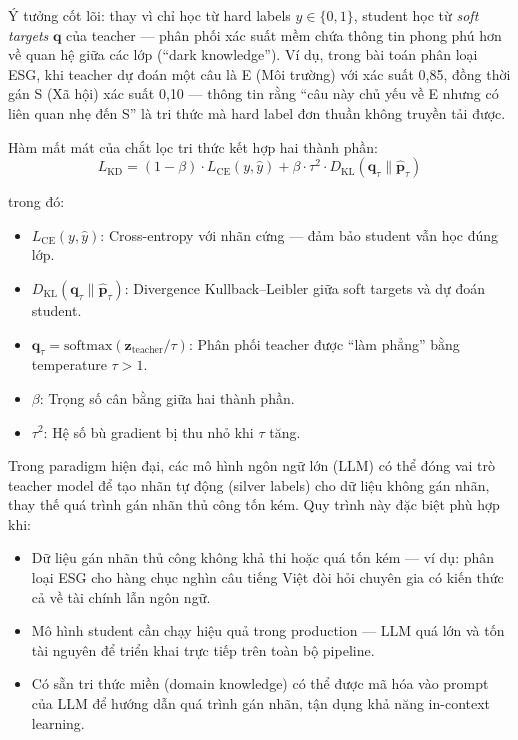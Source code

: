 Ý tưởng cốt lõi: thay vì chỉ học từ hard labels $y \in \{0, 1\}$, student học từ \textit{soft targets} $\mathbf{q}$ của teacher --- phân phối xác suất mềm chứa thông tin phong phú hơn về quan hệ giữa các lớp (``dark knowledge''). Ví dụ, trong bài toán phân loại ESG, khi teacher dự đoán một câu là E (Môi trường) với xác suất 0{,}85, đồng thời gán S (Xã hội) xác suất 0{,}10 --- thông tin rằng ``câu này chủ yếu về E nhưng có liên quan nhẹ đến S'' là tri thức mà hard label đơn thuần không truyền tải được.

Hàm mất mát của chắt lọc tri thức kết hợp hai thành phần:
\begin{equation}
    L_{\text{KD}} = (1 - \beta) \cdot L_{\text{CE}}(y, \hat{y}) + \beta \cdot \tau^2 \cdot D_{\text{KL}}(\mathbf{q}_\tau \| \hat{\mathbf{p}}_\tau)
    \label{eq:kd_loss}
\end{equation}

\noindent trong đó:
\begin{itemize}
    \item $L_{\text{CE}}(y, \hat{y})$: Cross-entropy với nhãn cứng --- đảm bảo student vẫn học đúng lớp.
    \item $D_{\text{KL}}(\mathbf{q}_\tau \| \hat{\mathbf{p}}_\tau)$: Divergence Kullback--Leibler giữa soft targets và dự đoán student.
    \item $\mathbf{q}_\tau = \text{softmax}(\mathbf{z}_{\text{teacher}} / \tau)$: Phân phối teacher được ``làm phẳng'' bằng temperature $\tau > 1$.
    \item $\beta$: Trọng số cân bằng giữa hai thành phần.
    \item $\tau^2$: Hệ số bù gradient bị thu nhỏ khi $\tau$ tăng.
\end{itemize}

Trong paradigm hiện đại, các mô hình ngôn ngữ lớn (LLM) có thể đóng vai trò teacher model để tạo nhãn tự động (silver labels) cho dữ liệu không gán nhãn, thay thế quá trình gán nhãn thủ công tốn kém. Quy trình này đặc biệt phù hợp khi:

\begin{itemize}
    \item Dữ liệu gán nhãn thủ công không khả thi hoặc quá tốn kém --- ví dụ: phân loại ESG cho hàng chục nghìn câu tiếng Việt đòi hỏi chuyên gia có kiến thức cả về tài chính lẫn ngôn ngữ.
    \item Mô hình student cần chạy hiệu quả trong production --- LLM quá lớn và tốn tài nguyên để triển khai trực tiếp trên toàn bộ pipeline.
    \item Có sẵn tri thức miền (domain knowledge) có thể được mã hóa vào prompt của LLM để hướng dẫn quá trình gán nhãn, tận dụng khả năng in-context learning.
\end{itemize}

